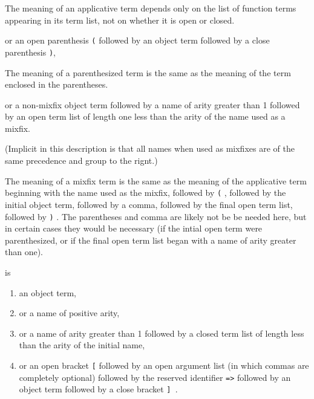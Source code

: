 \documentclass[12pt]{article}
\begin{document}
\begin{description}
\begin{description}
The meaning of an applicative term depends only on the list of function terms appearing in its term list, not on whether it is open or closed.

\item[parenthesized:]   or an open parenthesis \verb|(|  followed by an object term followed by a close parenthesis \verb|)|, 

The meaning of a parenthesized term is the same as the meaning of the term enclosed in the parentheses.

\item[mixfix:]   or a non-mixfix object term followed by a name of arity greater than 1 followed by an open term list of length one less than the arity of the name used as a mixfix.

(Implicit in this description is that all names when used as mixfixes are of the same precedence and group to the rignt.)

The meaning of a mixfix term is the same as the meaning of the applicative term beginning with the name used as the mixfix, followed by \verb|(| , followed by the initial object term, followed by a comma, followed by the final open term list, followed by \verb|)| .  The parentheses and comma are likely not be be needed here, but in certain cases they would be necessary (if the intial open term were parenthesized, or if the final open term list began with a name of arity greater than one).

\end{description}

\item [A function term] is 

\begin{enumerate}

\item an object term, 

\item or a name of positive arity, 

\item or a name of arity greater than 1 followed by a closed term list of length less than the arity of the initial name, 

\item or
an open bracket \verb|[| followed by an open argument list (in which commas are completely optional) followed by the reserved identifier {\tt =>} followed by an object term followed by a close bracket \verb|] |.

\end{enumerate}




\end{description}
\end{document}
